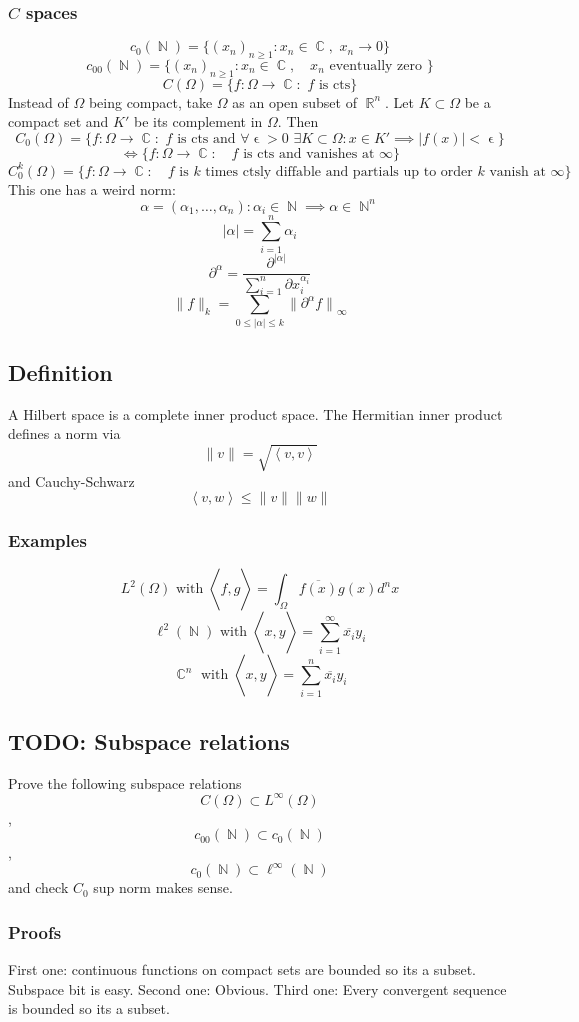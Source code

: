 \documentclass{article}
\DeclareMathOperator\eps{\epsilon}
\DeclareMathOperator\R{\mathbb{R}}
\DeclareMathOperator\N{\mathbb{N}}
\DeclareMathOperator\C{\mathbb{C}}
\DeclareMathOperator\la{\langle}
\DeclareMathOperator\ra{\rangle}
\newcommand{\seq}{(x_n)_{n \geq 1}}
\begin{document}
\subsubsection*{$C$ spaces}
$$
c_0(\N) = \{ \seq: x_n \in \C, \,\, x_n \to 0 \}
$$
$$
c_{00}(\N) = \{ \seq: x_n \in \C, \,\, \text{ $x_n$ eventually zero }  \}
$$
$$
C(\Omega) = \{ f: \Omega \to \C: \,\, f \text{ is cts} \}
$$
Instead of $\Omega$ being compact, take $\Omega$ as an open subset of $\R^n$.
Let $K \subset \Omega$ be a compact set and
$K'$ be its complement in $\Omega$. Then $$
C_0(\Omega) = \{ f: \Omega \to \C: \,\, f \text{ is cts and } \forall \eps > 0 \,\, \exists K \subset \Omega: x \in K' \implies |f(x)| < \eps  \}
$$
$$
\iff \{ f: \Omega \to \C: \,\, \text{ $f$ is cts and vanishes at $\infty$}  \}
$$
$$
C_0^k(\Omega) = \{ f: \Omega \to \C: \,\, \text{ $f$ is $k$ times ctsly diffable and partials up to order $k$ vanish at $\infty$}  \}
$$
This one has a weird norm:
$$
\alpha = (\alpha_1, \hdots, \alpha_n): \alpha_i \in \N \implies \alpha \in \N^n
$$
$$
|\alpha| = \sum_{i=1}^n \alpha_i
$$
$$
\partial^{\alpha} = \frac{\partial^{|\alpha|}}{\sum_{i=1}^n \partial x_i^{\alpha_i}}
$$
$$
\|f\|_k = \sum_{0 \leq |\alpha| \leq k} {\|\partial^{\alpha}f\|}_{\infty}
$$
\subsection*{Definition}
A Hilbert space is a complete inner product space. The Hermitian inner product defines a norm via
$$
\|v\| = \sqrt{\la v,v \ra}
$$
and Cauchy-Schwarz $$
\la v,w \ra \leq \|v\| \|w\|
$$
\subsubsection*{Examples}
$$
L^2(\Omega) \text{ with } \la f,g\ra =\int_{\Omega}
\overline{f(x)}g(x)d^nx
$$
$$
\ell^2(\N) \text{ with } \la x,y\ra = \sum_{i=1}^{\infty} \overline{x_i}y_i
$$
$$
\C^n \text{ with } \la x,y \ra = \sum_{i=1}^n \overline{x_i}y_i
$$
\subsection*{TODO: Subspace relations}
Prove the following subspace relations
$$C(\Omega) \subset L^{\infty}(\Omega)$$, $$c_{00}(\N) \subset c_0(\N)$$,
$$
c_0(\N) \subset \ell^{\infty}(\N)
$$
and check $C_0$ sup norm makes sense. \\ \newline
\subsubsection*{Proofs}
First one: continuous functions on compact sets are bounded so its a subset. Subspace bit is easy.
Second one: Obvious. Third one: Every convergent sequence is bounded so its a subset.
\end{document}
